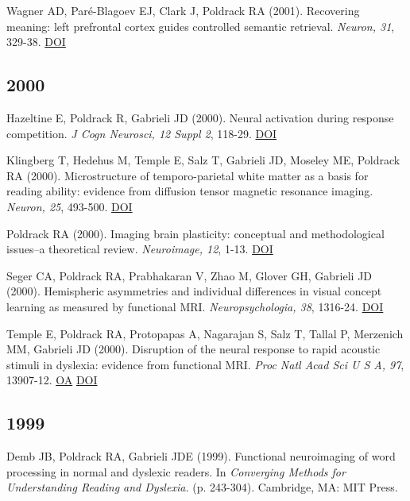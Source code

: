 \documentclass[10pt, letterpaper]{article}
\begin{document}
Wagner AD, Paré-Blagoev EJ, Clark J, Poldrack RA (2001). Recovering meaning: left prefrontal cortex guides controlled semantic retrieval. \textit{Neuron, 31}, 329-38. \href{http://dx.doi.org/10.1016/s0896-6273(01)00359-2}{DOI} \vspace{2mm}

\subsection*{2000}Hazeltine E, Poldrack R, Gabrieli JD (2000). Neural activation during response competition. \textit{J Cogn Neurosci, 12 Suppl 2}, 118-29. \href{http://dx.doi.org/10.1162/089892900563984}{DOI} \vspace{2mm}

Klingberg T, Hedehus M, Temple E, Salz T, Gabrieli JD, Moseley ME, Poldrack RA (2000). Microstructure of temporo-parietal white matter as a basis for reading ability: evidence from diffusion tensor magnetic resonance imaging. \textit{Neuron, 25}, 493-500. \href{http://dx.doi.org/10.1016/s0896-6273(00)80911-3}{DOI} \vspace{2mm}

Poldrack RA (2000). Imaging brain plasticity: conceptual and methodological issues--a theoretical review. \textit{Neuroimage, 12}, 1-13. \href{http://dx.doi.org/10.1006/nimg.2000.0596}{DOI} \vspace{2mm}

Seger CA, Poldrack RA, Prabhakaran V, Zhao M, Glover GH, Gabrieli JD (2000). Hemispheric asymmetries and individual differences in visual concept learning as measured by functional MRI. \textit{Neuropsychologia, 38}, 1316-24. \href{http://dx.doi.org/10.1016/s0028-3932(00)00014-2}{DOI} \vspace{2mm}

Temple E, Poldrack RA, Protopapas A, Nagarajan S, Salz T, Tallal P, Merzenich MM, Gabrieli JD (2000). Disruption of the neural response to rapid acoustic stimuli in dyslexia: evidence from functional MRI. \textit{Proc Natl Acad Sci U S A, 97}, 13907-12. \href{https://www.ncbi.nlm.nih.gov/pmc/articles/PMC17674}{OA} \href{http://dx.doi.org/10.1073/pnas.240461697}{DOI} \vspace{2mm}

\subsection*{1999}Demb JB, Poldrack RA, Gabrieli JDE (1999). Functional neuroimaging of word processing in normal and dyslexic readers. In \textit{Converging Methods for Understanding Reading and Dyslexia.} (p. 243-304). Cambridge, MA: MIT Press. \vspace{2mm}
\end{document}
